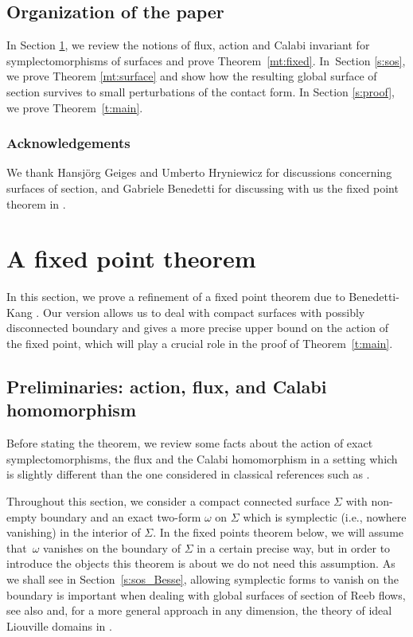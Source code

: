 \documentclass[11pt]{article}
\newcommand{\ie}{i.e.,\xspace}
\numberwithin{equation}{section}
\theoremstyle{definition}
\begin{document}
\subsection{Organization of the paper}
In Section \ref{s:fixed_point}, we review the notions of flux, action and Calabi invariant for symplectomorphisms of surfaces and prove Theorem~\ref{mt:fixed}. In~Section \ref{s:sos}, we prove Theorem \ref{mt:surface} and show how the resulting global surface of section survives to small perturbations of the contact form. In Section \ref{s:proof}, we prove Theorem~\ref{t:main}.

\subsubsection*{Acknowledgements}
We thank Hansjörg Geiges and Umberto Hryniewicz for discussions concerning surfaces of section, and Gabriele Benedetti for discussing with us the fixed point theorem in \cite{Benedetti:2021aa}.

\section{A fixed point theorem}
\label{s:fixed_point}

In this section, we prove a refinement of a fixed point theorem due to Benedetti-Kang \cite[\S 4.4]{Benedetti:2021aa}. Our version allows us to deal with compact surfaces with possibly disconnected boundary and gives a more precise upper bound on the action of the fixed point, which will play a crucial role in the proof of Theorem~\ref{t:main}.

\subsection{Preliminaries: action, flux, and Calabi homomorphism}
Before stating the theorem, we review some facts about the action of exact symplectomorphisms, the flux and the Calabi homomorphism in a setting which is slightly different than the one considered in classical references such as \cite{Calabi:1970,Banyaga:1978,Banyaga:1997,McDuff:1998uu}.

Throughout this section, we consider a compact connected surface $\Sigma$ with non-empty boundary and an exact two-form $\omega$ on $\Sigma$ which is symplectic (\ie nowhere vanishing) in the interior of $\Sigma$. In the fixed points theorem below, we will assume that~$\omega$ vanishes on the boundary of $\Sigma$ in a certain precise way, but in order to introduce the objects this theorem is about we do not need this assumption. As we shall see in Section~\ref{s:sos_Besse}, allowing symplectic forms to vanish on the boundary is important when dealing with global surfaces of section of Reeb flows, see also \cite{Abbondandolo:2018fb,Benedetti:2021aa} and, for a more general approach in any dimension, the theory of ideal Liouville domains in \cite{Giroux:2020}.
\end{document}
